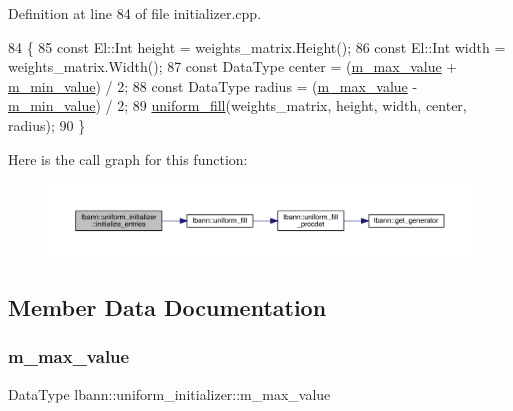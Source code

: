 Definition at line 84 of file initializer.\+cpp.


\begin{DoxyCode}
84                                                                              \{
85   \textcolor{keyword}{const} El::Int height = weights\_matrix.Height();
86   \textcolor{keyword}{const} El::Int width = weights\_matrix.Width();
87   \textcolor{keyword}{const} DataType center = (\hyperlink{classlbann_1_1uniform__initializer_a208a9e447137f182b5c2141a54c6e6cd}{m\_max\_value} + \hyperlink{classlbann_1_1uniform__initializer_aa8c380143e8804319b0ee2e277a4969c}{m\_min\_value}) / 2;
88   \textcolor{keyword}{const} DataType radius = (\hyperlink{classlbann_1_1uniform__initializer_a208a9e447137f182b5c2141a54c6e6cd}{m\_max\_value} - \hyperlink{classlbann_1_1uniform__initializer_aa8c380143e8804319b0ee2e277a4969c}{m\_min\_value}) / 2;
89   \hyperlink{namespacelbann_a7336c565aa23c1dab784530c581db3d1}{uniform\_fill}(weights\_matrix, height, width, center, radius);
90 \}
\end{DoxyCode}
Here is the call graph for this function\+:\nopagebreak
\begin{figure}[H]
\begin{center}
\leavevmode
\includegraphics[width=350pt]{classlbann_1_1uniform__initializer_a23461a8ab897f0aeafc524a61cb0f4eb_cgraph}
\end{center}
\end{figure}


\subsection{Member Data Documentation}
\mbox{\label{classlbann_1_1uniform__initializer_a208a9e447137f182b5c2141a54c6e6cd}} 
\subsubsection{\texorpdfstring{m\+\_\+max\+\_\+value}{m\_max\_value}}
{\footnotesize\ttfamily Data\+Type lbann\+::uniform\+\_\+initializer\+::m\+\_\+max\+\_\+value\hspace{0.3cm}{\ttfamily [private]}}


